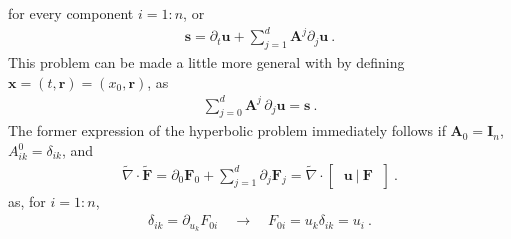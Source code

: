 \documentclass[letterpaper,10pt,english]{jupyterBook}
\begin{document}
\sphinxAtStartPar
for every component \(i = 1:n\), or
\begin{equation*}
\begin{split}\mathbf{s} = \partial_t \mathbf{u} + \sum_{j=1}^{d} \mathbf{A}^j \partial_j \mathbf{u} \ .\end{split}
\end{equation*}
\sphinxAtStartPar
This problem can be made a little more general with by defining \(\mathbf{x} = (t, \mathbf{r}) = ( x_0, \mathbf{r} )\), as
\begin{equation*}
\begin{split}\sum_{j=0}^{d} \mathbf{A}^j \, \partial_j \mathbf{u} = \mathbf{s} \ .\end{split}
\end{equation*}
\sphinxAtStartPar
The former expression of the hyperbolic problem immediately follows if \(\mathbf{A}_0 = \mathbf{I}_n\), \(A^0_{ik} = \delta_{ik}\), and
\begin{equation*}
\begin{split}\widetilde{\nabla} \cdot \widetilde{\mathbf{F}} = \partial_0 \mathbf{F}_0 + \sum_{j=1}^{d} \partial_j \mathbf{F}_j = \widetilde{\nabla} \cdot \begin{bmatrix} \ \mathbf{u} \ | \ \mathbf{F} \ \end{bmatrix} \ .\end{split}
\end{equation*}
\sphinxAtStartPar
as, for \(i = 1:n\),
\begin{equation*}
\begin{split}\delta_{ik} = \partial_{u_k} F_{0i} \quad \rightarrow \quad F_{0i} = u_k \delta_{ik} = u_i \ .\end{split}
\end{equation*}
\end{document}
